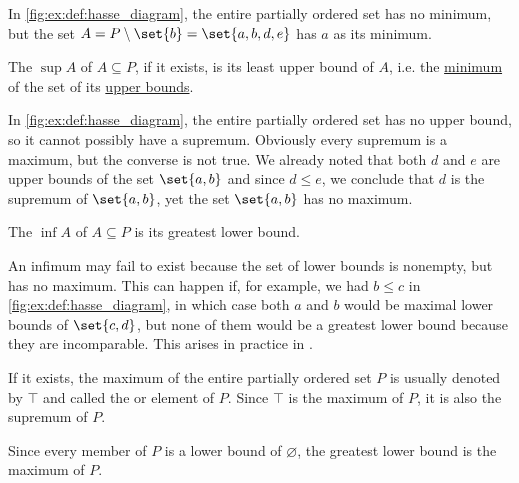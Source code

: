 \begin{definition}
\begin{thmenum}
\begin{minipage}[t]{0.45\textwidth}
      In \cref{fig:ex:def:hasse_diagram}, the entire partially ordered set has no minimum, but the set \( A = P \setminus \set{ b } = \set{ a, b, d, e } \) has \( a \) as its minimum.
    \end{minipage}

    \begin{minipage}[t]{0.45\textwidth}
      The  \( \sup A \) of \( A \subseteq P \), if it exists, is its least upper bound of \( A \), i.e. the \hyperref[def:extremal_points/maximum_and_minimum]{minimum} of the set of its \hyperref[def:extremal_points/upper_and_lower_bounds]{upper bounds}.

      In \cref{fig:ex:def:hasse_diagram}, the entire partially ordered set has no upper bound, so it cannot possibly have a supremum. Obviously every supremum is a maximum, but the converse is not true. We already noted that both \( d \) and \( e \) are upper bounds of the set \( \set{ a, b } \) and since \( d \leq e \), we conclude that \( d \) is the supremum of \( \set{ a, b } \), yet the set \( \set{ a, b } \) has no maximum.
    \end{minipage}
    \hspace{0.02\textwidth}
    \begin{minipage}[t]{0.45\textwidth}
      The  \( \inf A \) of \( A \subseteq P \) is its greatest lower bound.

      An infimum may fail to exist because the set of lower bounds is nonempty, but has no maximum. This can happen if, for example, we had \( b \leq c \) in \cref{fig:ex:def:hasse_diagram}, in which case both \( a \) and \( b \) would be maximal lower bounds of \( \set{ c, d } \), but none of them would be a greatest lower bound because they are incomparable. This arises in practice in .
    \end{minipage}

    \begin{minipage}[t]{0.45\textwidth}
      If it exists, the maximum of the entire partially ordered set \( P \) is usually denoted by \( \top \) and called the  or  element of \( P \). Since \( \top \) is the maximum of \( P \), it is also the supremum of \( P \).

      Since every member of \( P \) is a lower bound of \( \varnothing \), the greatest lower bound is the maximum of \( P \).


\end{minipage}
\end{thmenum}
\end{definition}
